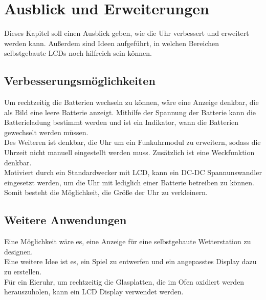 \section{Ausblick und Erweiterungen}

Dieses Kapitel soll einen Ausblick geben, wie die Uhr verbessert und erweitert werden kann. Außerdem sind Ideen aufgeführt, in welchen Bereichen selbstgebaute LCDs noch hilfreich sein können.

\subsection{Verbesserungsmöglichkeiten}

Um rechtzeitig die Batterien wechseln zu können, wäre eine Anzeige denkbar, die als Bild eine leere Batterie anzeigt. Mithilfe der Spannung der Batterie kann die Batterieladung bestimmt werden und ist ein Indikator, wann die Batterien gewechselt werden müssen.\\

Des Weiteren ist denkbar, die Uhr um ein Funkuhrmodul zu erweitern, sodass die Uhrzeit nicht manuell eingestellt werden muss. Zusätzlich ist eine Weckfunktion denkbar.\\

Motiviert durch ein Standardwecker mit LCD, kann ein DC-DC Spannunswandler eingesetzt werden, um die Uhr mit lediglich einer Batterie betreiben zu können. Somit besteht die Möglichkeit, die Größe der Uhr zu verkleinern.

\subsection{Weitere Anwendungen}

Eine Möglichkeit wäre es, eine Anzeige für eine selbstgebaute Wetterstation zu designen.\\

Eine weitere Idee ist es, ein Spiel zu entwerfen und ein angepasstes Display dazu zu erstellen.\\

Für ein Eieruhr, um rechtzeitig die Glasplatten, die im Ofen oxidiert werden herauszuholen, kann ein LCD Display verwendet werden.

